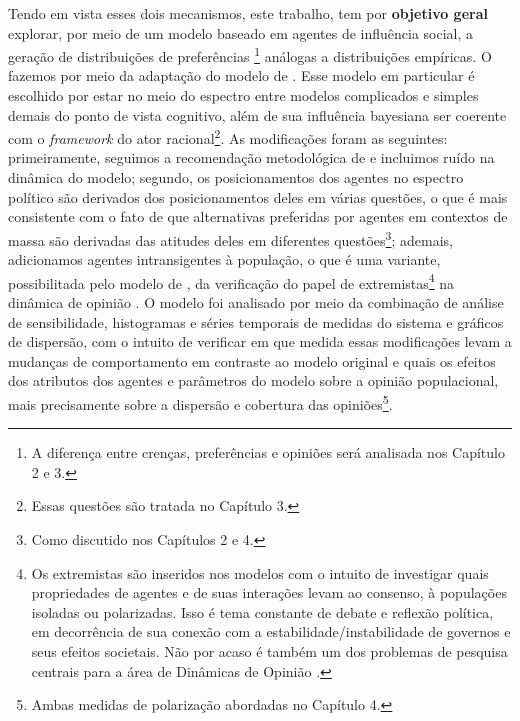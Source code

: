 Tendo em vista esses dois mecanismos, este trabalho, tem por \textbf{objetivo
  geral} explorar, por meio de um modelo baseado em agentes de influência
  social, a geração de distribuições de preferências \footnote{A diferença entre
  crenças, preferências e opiniões será analisada nos Capítulo 2 e 3.} análogas
  a distribuições empíricas. O fazemos por meio da adaptação do modelo de
  . Esse modelo em particular é escolhido por
  estar no meio do espectro entre modelos complicados e simples demais do ponto
  de vista cognitivo, além de sua influência bayesiana ser coerente com o
  \textit{framework} do ator racional\footnote{Essas questões são tratada no
  Capítulo 3.}. As modificações foram as seguintes: primeiramente, seguimos a
  recomendação metodológica de  e incluimos ruído na
  dinâmica do modelo; segundo, os posicionamentos dos agentes no espectro
  político são derivados dos posicionamentos deles em várias questões, o que é
  mais consistente com o fato de que alternativas preferidas por agentes em
  contextos de massa são derivadas das atitudes deles em diferentes
  questões\footnote{Como discutido nos Capítulos 2 e 4.}; ademais, adicionamos
  agentes intransigentes à população, o que é uma variante, possibilitada pelo
  modelo de , da verificação do papel de
  extremistas\footnote{ Os extremistas são inseridos nos modelos com o intuito
  de investigar quais propriedades de agentes e de suas interações levam ao
  consenso, à populações isoladas ou polarizadas. Isso é tema constante de
  debate e reflexão política, em decorrência de sua conexão com a
  estabilidade/instabilidade de governos e seus efeitos societais. Não por acaso
  é também um dos problemas de pesquisa centrais para a área de Dinâmicas de
  Opinião \cite{fiorina2005culture, pulick2016, bramson2016disambiguation}.} na
  dinâmica de opinião \cite{deffuant2002can, flache2017}. O modelo foi analisado
  por meio da combinação de análise de sensibilidade, histogramas e séries
  temporais de medidas do sistema e gráficos de dispersão, com o intuito de
  verificar em que medida essas modificações levam a mudanças de comportamento
  em contraste ao modelo original e quais os efeitos dos atributos dos agentes e
  parâmetros do modelo sobre a opinião populacional, mais precisamente sobre a
  dispersão e cobertura das opiniões\footnote{Ambas medidas de polarização
  abordadas no Capítulo 4.}.


